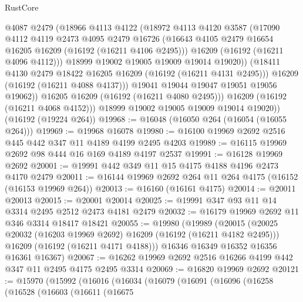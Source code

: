\begin{lexlean}{RustCore}
\begin{coremodule}
                  @4087
                  @2479
                  (@18966
                    @4113
                    @4122
                    (@18972
                      @4113
                      @4120
                      @3587
                      (@17090
                        @4112
                        @4119
                        @2473
                        @4095
                        @2479
                        @16726
                        (@16643 @4105 @2479 @16654 @16205 @16209 (@16192 (@16211 @4106 @2495)))
                        @16209
                        (@16192 (@16211 @4096 @4112)))
                      @18999
                      @19002
                      @19005
                      @19009
                      @19014
                      @19020))
                  (@18411 @4130 @2479 @18422 @16205 @16209 (@16192 (@16211 @4131 @2495)))
                  @16209
                  (@16192 (@16211 @4088 @4137)))
                @19041
                @19044
                @19047
                @19051
                @19056
                @19062))
            @16205
            @16209
            (@16192 (@16211 @4080 @2495)))
          @16209
          (@16192 (@16211 @4068 @4152)))
        @18999
        @19002
        @19005
        @19009
        @19014
        @19020))
    (@16192 (@19224 @264))
@19968 := @16048 (@16050 @264 (@16054 (@16055 @264)))
@19969 := @19968 @16078
@19980 := @16100 @19969 @2692 @2516 @445 @442 @347 @11 @4189 @4199 @2495 @4203
@19989 := @16115 @19969 @2692 @98 @444 @16 @169 @4189 @4197 @2537
@19991 := @16128 @19969 @2692
@20001 := @19991 @442 @349 @11 @15 @4175 @4188 @4196 @2473 @4170 @2479
@20011 := @16144 @19969 @2692 @264 @11 @264 @4175 (@16152 (@16153 @19969 @264))
@20013 := @16160 (@16161 @4175)
@20014 := @20011 @20013
@20015 := @20001 @20014
@20025 := @19991 @347 @93 @11 @14 @3314 @2495 @2512 @2473 @4181 @2479
@20032 := @16179 @19969 @2692 @11 @346 @3314 @18417 @18421
@20055 := @19980
    (@19989
      (@20015
        (@20025 @20032 (@16203 @19969 @2692) @16209 (@16192 (@16211 @4182 @2495)))
        @16209
        (@16192 (@16211 @4171 @4188)))
      @16346
      @16349
      @16352
      @16356
      @16361
      @16367)
@20067 := @16262 @19969 @2692 @2516 @16266 @4199 @442 @347 @11 @2495 @4175 @2495 @3314
@20069 := @16820 @19969 @2692
@20121 := @15970
    (@15992
      (@16016
        (@16034
          (@16079
            (@16091
              (@16096
                (@16258
                  (@16528
                    (@16603
                      (@16611
                        (@16675

\end{coremodule}
\end{lexlean}
